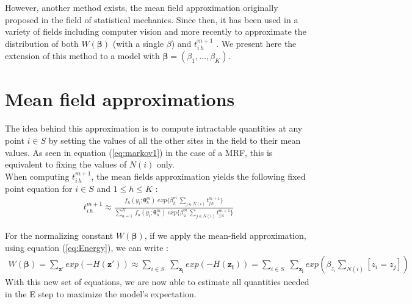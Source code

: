 However, another method exists, the mean field approximation originally proposed in the field of statistical mechanics. Since then, it has been used in a variety of fields including computer vision \cite{Yuille90} and more recently to approximate the distribution of both $W(\mathbf{\beta})$ (with a single $\beta$) and $t_{i\,h}^{m+1}$ \cite{Zhang92}. We present here the extension of this method to a model with $\mathbf{\beta} = (\beta_1, \hdots, \beta_K)$.

\section{Mean field approximations}

The idea behind this approximation is to compute intractable quantities at any point $i \in S$ by setting the values of all the other sites in the field to their mean values. As seen in equation (\ref{eq:markov1}) in the case of a MRF, this is equivalent to fixing the values of $N(i)$ only.\\

When computing $t_{i\,h}^{m+1}$, the mean fields approximation yields the following fixed point equation \cite{Dang98} for $i \in S$ and $1 \leq h \leq K$ :
\begin{align}
\label{eq:fixedpoint}
t_{i\,h}^{m+1} \approx \frac{f_{h} (y_i;\mathbf{\theta}_{h}^m)\; exp\{\beta_h^m \: \sum_{j \in N(i)} t_{j\,h}^{m+1}\}}{\sum_{u=1}^K \: f_{u} (y_i;\mathbf{\theta}_{u}^m)\; exp\{\beta_u^m \: \sum_{j \in N(i)} t_{j\,u}^{m+1}\}}
\end{align}

For the normalizing constant $W(\mathbf{\beta})$, if we apply the mean-field approximation, using equation (\ref{eq:Energy}), we can write :
\begin{align*}
W(\mathbf{\beta}) = \sum\limits_{\mathbf{z'}} exp(-H(\mathbf{z'})) \approx \sum\limits_{i \in S}\;\sum\limits_{\mathbf{z_i}} exp(-H(\mathbf{z_i})) = \sum\limits_{i \in S}\;\sum\limits_{\mathbf{z_i}} exp(\beta_{z_i}\sum\limits_{N(i)}[z_i=z_j])
\end{align*}
With this new set of equations, we are now able to estimate all quantities needed in the E step to maximize the model's expectation.\\

